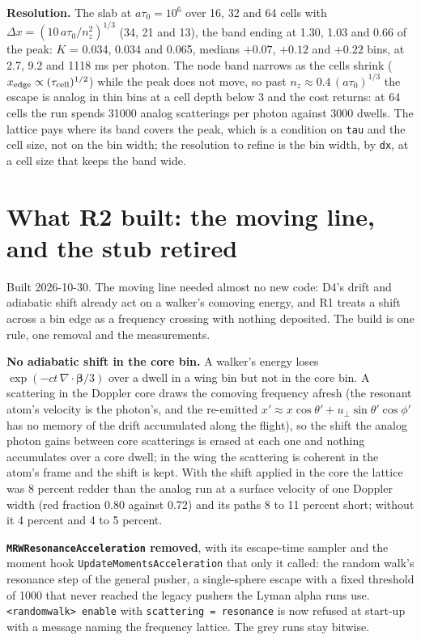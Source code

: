 \documentclass[11pt]{article}
\newcommand{\key}[1]{\texttt{#1}}
\begin{document}
\textbf{Resolution.}  The slab at $a\tau_0 = 10^6$ over 16, 32 and 64 cells with
$\Delta x = (10\,a\tau_0/n_z^2)^{1/3}$ (34, 21 and 13), the band ending at 1.30, 1.03
and 0.66 of the peak: $K$ = 0.034, 0.034 and 0.065, medians $+0.07$, $+0.12$ and
$+0.22$ bins, at 2.7, 9.2 and 1118 ms per photon.  The node band narrows as the cells
shrink ($x_{\rm edge} \propto (\tau_{\rm cell})^{1/2}$) while the peak does not move,
so past $n_z \approx 0.4\,(a\tau_0)^{1/3}$ the escape is analog in thin bins at a cell
depth below 3 and the cost returns: at 64 cells the run spends 31000 analog
scatterings per photon against 3000 dwells.  The lattice pays where its band covers
the peak, which is a condition on \key{tau} and the cell size, not on the bin width;
the resolution to refine is the bin width, by \key{dx}, at a cell size that keeps the
band wide.

\section{What R2 built: the moving line, and the stub retired}
\label{sec:r2}

Built 2026-10-30.  The moving line needed almost no new code: D4's drift and
adiabatic shift already act on a walker's comoving energy, and R1 treats a shift across
a bin edge as a frequency crossing with nothing deposited.  The build is one rule, one
removal and the measurements.

\textbf{No adiabatic shift in the core bin.}  A walker's energy loses
$\exp(-ct\,\nabla\!\cdot\!\boldsymbol\beta/3)$ over a dwell in a wing bin but not in
the core bin.  A scattering in the Doppler core draws the comoving frequency afresh
(the resonant atom's velocity is the photon's, and the re-emitted $x' \approx
x\cos\theta' + u_\perp\sin\theta'\cos\phi'$ has no memory of the drift accumulated
along the flight), so the shift the analog photon gains between core scatterings is
erased at each one and nothing accumulates over a core dwell; in the wing the
scattering is coherent in the atom's frame and the shift is kept.  With the shift
applied in the core the lattice was 8 percent redder than the analog run at a surface
velocity of one Doppler width (red fraction 0.80 against 0.72) and its paths 8 to 11
percent short; without it 4 percent and 4 to 5 percent.

\textbf{\texttt{MRWResonanceAcceleration} removed}, with its escape-time sampler and
the moment hook \texttt{UpdateMomentsAcceleration} that only it called: the random
walk's resonance step of the general pusher, a single-sphere escape with a fixed
threshold of 1000 that never reached the legacy pushers the Lyman alpha runs use.
\key{<randomwalk> enable} with \key{scattering = resonance} is now refused at start-up
with a message naming the frequency lattice.  The grey runs stay bitwise.
\end{document}
